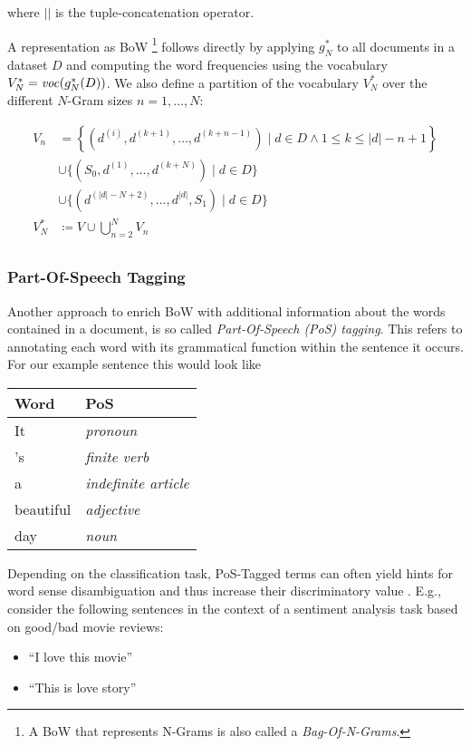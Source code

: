 where $||$ is the tuple-concatenation operator.

A representation as BoW \footnote{A BoW that represents N-Grams is also called a
\emph{Bag-Of-N-Grams}. } follows directly by applying $g_N^*$ to all documents
in a dataset $D$ and computing the word frequencies using the vocabulary
$V_N^* = \mathit{voc}(g_N^*(D))$. We also define a partition of the vocabulary
$V_N^*$ over the different $N$-Gram sizes $n=1,\ldots,N$:

\begin{equation*}
\begin{split}
V_n &=  \left \{(d^{(i)},
d^{(k+1)},\ldots,d^{(k+n-1)}) \mid d \in D \wedge 1 \leq k \leq |d|-n+1
\right\} \\
& \cup \{ (S_0,d^{(1)},\ldots,d^{(k+N)})  \mid d \in D \} \\
& \cup \{ (d^{(|d|-N+2)},\ldots,d^{|d|},S_1) \mid d \in D\} \\
V_N^* &\coloneqq V \cup \bigcup\limits_{n=2}^N  V_n \\
\end{split}
\end{equation*}

\subsubsection{Part-Of-Speech Tagging}
Another approach to enrich BoW with additional information about the words
contained in a document, is so called \emph{Part-Of-Speech (PoS) tagging}.
This refers to annotating each word with its grammatical function within the sentence it occurs.
For our example sentence this would look like

\begin{center}
\begin{tabular}{|l|l|}
\hline
\textbf{Word} & \textbf{PoS} \\
\hline
It 		  & \emph{pronoun} \\
's 		  & \emph{finite verb} \\
a 		  & \emph{indefinite article}  \\
beautiful & \emph{adjective} \\
day		  & \emph{noun} \\
\hline
\end{tabular}
\end{center}

Depending on the classification task, PoS-Tagged terms can often yield
hints for word sense disambiguation and thus increase their discriminatory
value \cite{wilks1998grammar}. E.g., consider the following sentences in
the context of a sentiment analysis task based on good/bad movie reviews:
\begin{itemize}
  \item ``I love this movie''
  \item ``This is love story'' 
\end{itemize}
 
